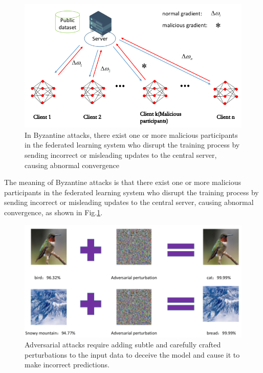 \documentclass[conference]{IEEEtran}
\begin{document}
\begin{figure}[htbp]
    \centerline{\includegraphics[width=0.8\linewidth,height=0.6\linewidth]{picture/byattack.png}}
    \caption{In Byzantine attacks, there exist one or more malicious participants 
    in the federated learning system 
    who disrupt the training process by sending incorrect or misleading updates 
    to the central server, causing abnormal convergence}
    \label{fig3}
\end{figure}

The meaning of Byzantine attacks\cite{b21,b22,b27} is that 
there exist one or more malicious participants in the federated learning system 
who disrupt the training process by sending incorrect or misleading updates 
to the central server, causing abnormal convergence, as shown in Fig.\ref{fig3}.

\begin{figure}[htbp]
    \centerline{\includegraphics[width=0.8\linewidth,height=0.6\linewidth]{picture/adversarial_attack.png}}
    \caption{Adversarial attacks require adding subtle and 
    carefully crafted perturbations 
    to the input data to deceive the model and 
    cause it to make incorrect predictions. }
    \label{fig4}
\end{figure}
\end{document}
